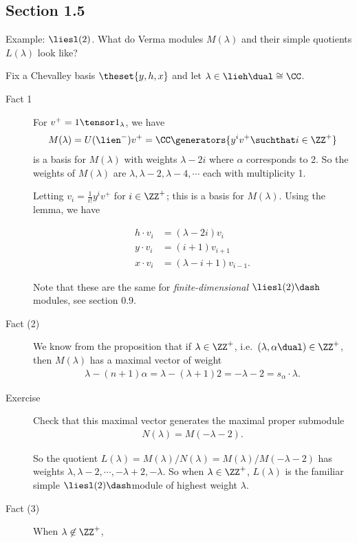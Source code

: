 \hypertarget{section-1.5}{%
\subsection{Section 1.5}\label{section-1.5}}

Example: \(\liesl(2)\). What do Verma modules \(M(\lambda)\) and their
simple quotients \(L(\lambda)\) look like?

Fix a Chevalley basis \(\theset{y,h,x}\) and let
\(\lambda \in \lieh\dual \cong \CC\).

\begin{description}
\item[Fact 1]
For \(v^+ = 1\tensor 1_\lambda\), we have
\begin{align*}M(\lambda) = U(\lien^-) v^+ = \CC \generators{y^i v^+ \suchthat i\in \ZZ^+}\end{align*}
is a basis for \(M(\lambda)\) with weights \(\lambda - 2i\) where
\(\alpha\) corresponds to 2. So the weights of \(M(\lambda)\) are
\(\lambda, \lambda-2, \lambda-4, \cdots\) each with multiplicity 1.

Letting \(v_i = \frac 1 {i!} y^i v^+\) for \(i\in \ZZ^+\); this is a
basis for \(M(\lambda)\). Using the lemma, we have

\begin{align*}
h\cdot v_i &= (\lambda - 2i) v_i \\
y \cdot v_i &= (i+1) v_{i+1} \\
x\cdot v_i &= (\lambda - i + 1)v_{i-1} 
.\end{align*}

Note that these are the same for \emph{finite-dimensional}
\(\liesl(2)\dash\)modules, see section 0.9.
\item[Fact (2)]
We know from the proposition that if \(\lambda \in \ZZ^+\),
i.e.~\((\lambda, \alpha\dual) \in \ZZ^+\), then \(M(\lambda)\) has a
maximal vector of weight
\begin{align*}\lambda - (n+1)\alpha = \lambda - (\lambda+1)2 = -\lambda-2 = s_\alpha \cdot \lambda.\end{align*}
\item[Exercise]
Check that this maximal vector generates the maximal proper submodule
\begin{align*}N(\lambda) = M(-\lambda - 2).\end{align*}

So the quotient
\(L(\lambda) = M(\lambda) / N(\lambda) = M(\lambda) / M(-\lambda - 2)\)
has weights \(\lambda, \lambda-2, \cdots, -\lambda+2, -\lambda\). So
when \(\lambda \in \ZZ^+\), \(L(\lambda)\) is the familiar simple
\(\liesl(2)\dash\)module of highest weight \(\lambda\).
\item[Fact (3)]
When \(\lambda \not\in\ZZ^+\),


\end{description}
